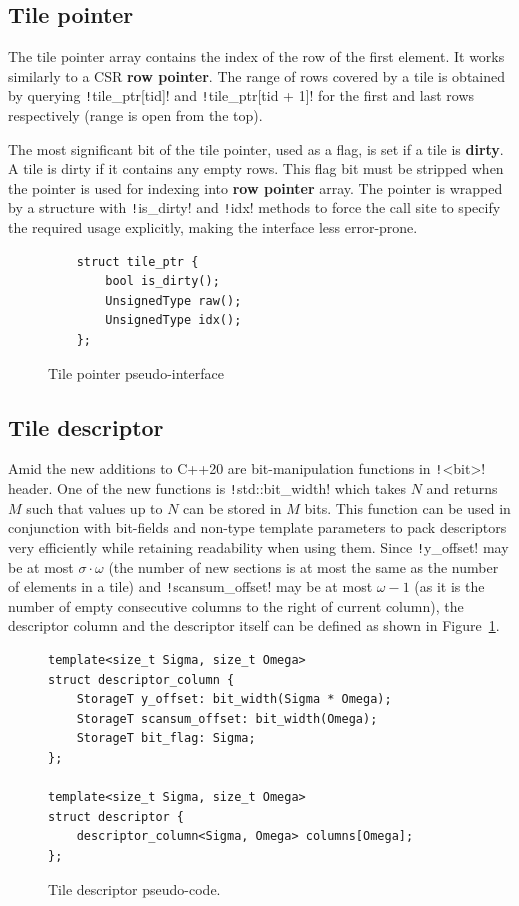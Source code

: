 \documentclass[thesis=M,english]{FITthesis}[2019/12/23]
\newcommand{\csre}[1]{\texttt!#1!}
\begin{document}
\subsection{Tile pointer}

The tile pointer array contains the index of the row of the first element. It works similarly to a CSR
\textbf{row pointer}. The range of rows covered by a tile is obtained by querying \csre{tile_ptr[tid]}
and \csre{tile_ptr[tid + 1]} for the first and last rows respectively (range is open from the top).

The most significant bit of the tile pointer, used as a flag, is set if a tile is \textbf{dirty}.
A tile is dirty if it contains any empty rows. This flag bit must be stripped when the pointer is used for 
indexing into \textbf{row pointer} array. The pointer is wrapped by a structure with \csre{is_dirty} and 
\csre{idx} methods to force the call site to specify the required usage explicitly, making the interface 
less error-prone.

\begin{figure}[htp]
    \begin{verbatim}
    struct tile_ptr {
        bool is_dirty();
        UnsignedType raw(); 
        UnsignedType idx(); 
    };
    \end{verbatim}
    \caption{Tile pointer pseudo-interface}
\end{figure}



\subsection{Tile descriptor}

Amid the new additions to C++20 are bit-manipulation functions in \csre{<bit>} header.
One of the new functions is \csre{std::bit_width} which takes \(N\) and returns \(M\) such that values
up to \(N\) can be stored in \(M\) bits. This function can be used in conjunction with bit-fields
and non-type template parameters to pack descriptors very efficiently while retaining readability when using
them. Since \csre{y_offset} may be at most \(\sigma \cdot \omega\) (the number of new sections is at most the same
as the number of elements in a tile) and \csre{scansum_offset} may be at most \(\omega - 1\) (as it is the number
of empty consecutive columns to the right of current column), the descriptor column and the descriptor
itself can be defined as shown in Figure~\ref{csr5:tileDesc}.

\begin{figure}[htp]

    \begin{verbatim}
template<size_t Sigma, size_t Omega>
struct descriptor_column {
    StorageT y_offset: bit_width(Sigma * Omega);
    StorageT scansum_offset: bit_width(Omega);
    StorageT bit_flag: Sigma;
};

template<size_t Sigma, size_t Omega>
struct descriptor {
    descriptor_column<Sigma, Omega> columns[Omega];
};
    \end{verbatim}
    \caption{Tile descriptor pseudo-code.}\label{csr5:tileDesc}
\end{figure}
\end{document}
